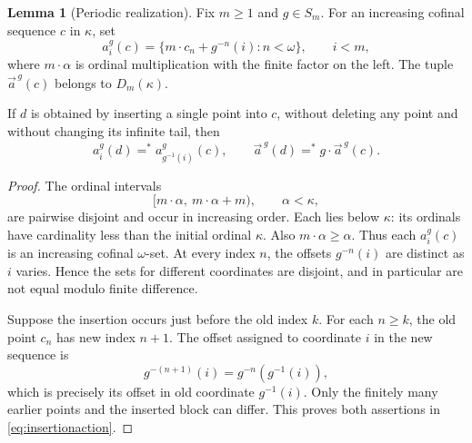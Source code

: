 \documentclass[11pt,letterpaper]{article}
\theoremstyle{definition}
\newtheorem{lemma}[definition]{Lemma}
\numberwithin{equation}{section}
\begin{document}
\begin{lemma}[Periodic realization]\label{lem:realization}
Fix $m\ge1$ and $g\in S_m$. For an increasing cofinal sequence $c$ in $\kappa$, set
\begin{equation}\label{eq:periodiccode}
a_i^g(c)=\{m\cdot c_n+g^{-n}(i):n<\omega\},
\qquad i<m,
\end{equation}
where $m\cdot\alpha$ is ordinal multiplication with the finite factor on the left. The tuple $\vec a^{\,g}(c)$ belongs to $D_m(\kappa)$.

If $d$ is obtained by inserting a single point into $c$, without deleting any point and without changing its infinite tail, then
\begin{equation}\label{eq:insertionaction}
a_i^g(d)=^*a_{g^{-1}(i)}^g(c),
\qquad
\vec a^{\,g}(d)=^*g\cdot\vec a^{\,g}(c).
\end{equation}
\end{lemma}
\begin{proof}
The ordinal intervals
\[
[m\cdot\alpha,\ m\cdot\alpha+m),\qquad \alpha<\kappa,
\]
are pairwise disjoint and occur in increasing order. Each lies below $\kappa$: its ordinals have cardinality less than the initial ordinal $\kappa$. Also $m\cdot\alpha\ge\alpha$. Thus each $a_i^g(c)$ is an increasing cofinal $\omega$-set. At every index $n$, the offsets $g^{-n}(i)$ are distinct as $i$ varies. Hence the sets for different coordinates are disjoint, and in particular are not equal modulo finite difference.

Suppose the insertion occurs just before the old index $k$. For each $n\ge k$, the old point $c_n$ has new index $n+1$. The offset assigned to coordinate $i$ in the new sequence is
\[
g^{-(n+1)}(i)=g^{-n}(g^{-1}(i)),
\]
which is precisely its offset in old coordinate $g^{-1}(i)$. Only the finitely many earlier points and the inserted block can differ. This proves both assertions in \eqref{eq:insertionaction}.
\end{proof}
\end{document}
